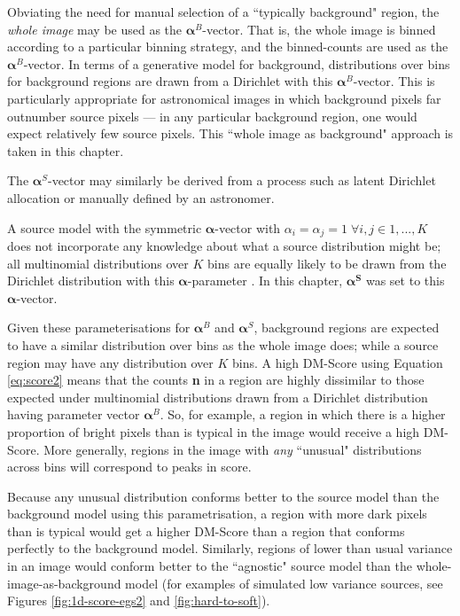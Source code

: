 Obviating the need for manual selection of a ``typically background" region, the \emph{whole image} may be used as the $\boldsymbol{\alpha}^B$-vector. That is, the whole image is binned according to a particular binning strategy, and the binned-counts are used as the $\boldsymbol{\alpha}^B$-vector. In terms of a generative model for background, distributions over bins for background regions are drawn from a Dirichlet with this $\boldsymbol{\alpha}^B$-vector. This is particularly appropriate for astronomical images in which background pixels far outnumber source pixels --- in any particular background region, one would expect relatively few source pixels. This ``whole image as background" approach is taken in this chapter.

The $\boldsymbol{\alpha}^S$-vector may similarly be derived from a process such as latent Dirichlet allocation or manually defined by an astronomer. 

A source model with the symmetric $\boldsymbol{\alpha}$-vector with $\alpha_i = \alpha_j = 1 \; \forall i,j \in 1,...,K$ does not incorporate any knowledge about what a source distribution might be; all multinomial distributions over $K$ bins are equally likely to be drawn from the Dirichlet distribution with this $\boldsymbol{\alpha}$-parameter \cite{frigyik2010introduction}. In this chapter, $\boldsymbol{\alpha^S}$ was set to this $\boldsymbol{\alpha}$-vector.

Given these parameterisations for $\boldsymbol{\alpha}^B$ and $\boldsymbol{\alpha}^S$, background regions are expected to have a similar distribution over bins as the whole image does; while a source region may have any distribution over $K$ bins. A high DM-Score using Equation \ref{eq:score2} means that the counts \textbf{n} in a region are highly dissimilar to those expected under multinomial distributions drawn from a Dirichlet distribution having parameter vector $\boldsymbol{\alpha}^B$. So, for example, a region in which there is a higher proportion of bright pixels than is typical in the image would receive a high DM-Score. More generally, regions in the image with \textit{any} ``unusual" distributions across bins will correspond to peaks in score.

Because any unusual distribution conforms better to the source model than the background model using this parametrisation, a region with more dark pixels than is typical would get a higher DM-Score than a region that conforms perfectly to the background model. Similarly, regions of lower than usual variance in an image would conform better to the ``agnostic" source model than the whole-image-as-background model (for examples of simulated low variance sources, see Figures \ref{fig:1d-score-egs2} and \ref{fig:hard-to-soft}).

